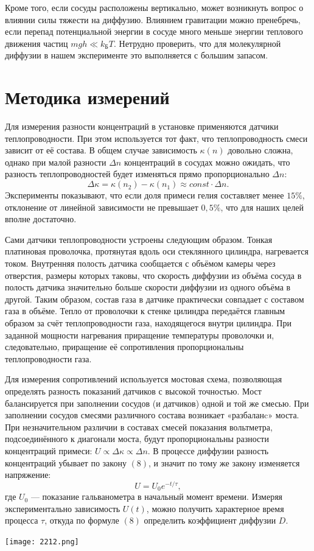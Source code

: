 Кроме того, если сосуды расположены вертикально, может возникнуть вопрос о влиянии силы тяжести на диффузию. Влиянием гравитации можно пренебречь, если перепад потенциальной энергии в сосуде много меньше энергии теплового движения частиц $mgh \ll k_{\text{Б}} T$. Нетрудно проверить, что для молекулярной диффузии в нашем эксперименте это выполняется с большим запасом.

\section{Методика измерений}

 Для измерения разности концентраций в установке применяются датчики теплопроводности. При этом используется тот факт, что теплопроводность смеси зависит от её состава. В общем случае зависимость $\kappa(n)$ довольно сложна, однако при малой разности $\Delta n$ концентраций в сосудах можно ожидать, что разность теплопроводностей будет изменяться прямо пропорционально $\Delta n$: $$\Delta \kappa = \kappa (n_2) - \kappa (n_1) \approx const \cdot \Delta n.$$
Эксперименты показывают, что если доля примеси гелия составляет менее $15\%$, отклонение от линейной зависимости не превышает $0,5\%$, что для наших целей вполне достаточно.

Сами датчики теплопроводности устроены следующим образом. Тонкая платиновая проволочка, протянутая вдоль оси стеклянного цилиндра, нагревается током. Внутренняя полость датчика сообщается с объёмом камеры через отверстия, размеры которых таковы, что скорость диффузии из объёма сосуда в полость датчика значительно больше скорости диффузии из одного объёма в другой. Таким образом, состав газа в датчике практически совпадает с составом газа в объёме. Тепло от проволочки к стенке цилиндра передаётся главным образом за счёт теплопроводности газа, находящегося внутри цилиндра. При заданной мощности нагревания приращение температуры проволочки и, следовательно, приращение её сопротивления пропорциональны теплопроводности газа.

Для измерения сопротивлений используется мостовая схема, позволяющая определять разность показаний датчиков с высокой точностью. Мост балансируется при заполнении сосудов (и датчиков) одной и той же смесью. При заполнении сосудов смесями различного состава возникает «разбаланc» моста. При незначительном различии в составах смесей показания вольтметра, подсоединённого к диагонали моста, будут пропорциональны разности концентраций примеси: $U \propto \Delta \kappa \propto \Delta n$. В процессе диффузии разность концентраций убывает по закону $(8)$, и значит по тому же закону изменяется напряжение: 
\begin{equation}
	U = U_0 e^{-t/\tau},
\end{equation}
где $U_0$ --- показание гальванометра в начальный момент времени. Измеряя экспериментально зависимость $U(t)$, можно получить характерное время процесса $\tau$, откуда по формуле $(8)$ определить коэффициент диффузии $D$.
\begin{center}
    \texttt{[image: 2212.png]}
\end{center}

